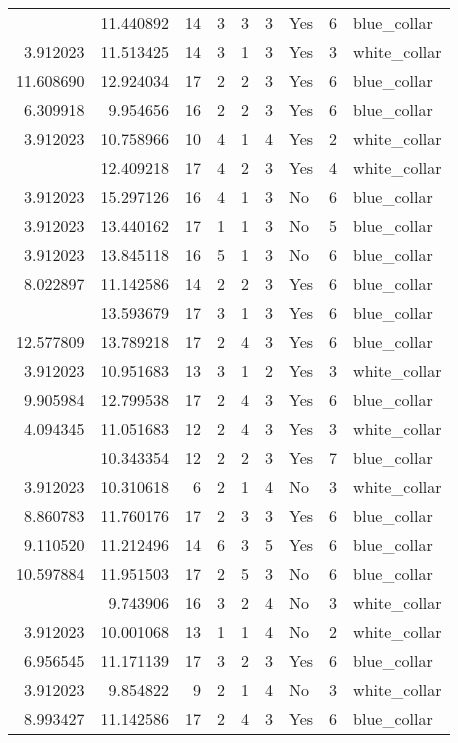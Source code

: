 \documentclass[
]{article}
\begin{document}
\begin{longtable}[t]{rrrrrllrl}
\addlinespace
7.625595 & 11.440892 & 14 & 3 & 3 & 3 & Yes & 6 & blue\_collar\\
3.912023 & 11.513425 & 14 & 3 & 1 & 3 & Yes & 3 & white\_collar\\
11.608690 & 12.924034 & 17 & 2 & 2 & 3 & Yes & 6 & blue\_collar\\
6.309918 & 9.954656 & 16 & 2 & 2 & 3 & Yes & 6 & blue\_collar\\
3.912023 & 10.758966 & 10 & 4 & 1 & 4 & Yes & 2 & white\_collar\\
\addlinespace
10.820778 & 12.409218 & 17 & 4 & 2 & 3 & Yes & 4 & white\_collar\\
3.912023 & 15.297126 & 16 & 4 & 1 & 3 & No & 6 & blue\_collar\\
3.912023 & 13.440162 & 17 & 1 & 1 & 3 & No & 5 & blue\_collar\\
3.912023 & 13.845118 & 16 & 5 & 1 & 3 & No & 6 & blue\_collar\\
8.022897 & 11.142586 & 14 & 2 & 2 & 3 & Yes & 6 & blue\_collar\\
\addlinespace
3.912023 & 13.593679 & 17 & 3 & 1 & 3 & Yes & 6 & blue\_collar\\
12.577809 & 13.789218 & 17 & 2 & 4 & 3 & Yes & 6 & blue\_collar\\
3.912023 & 10.951683 & 13 & 3 & 1 & 2 & Yes & 3 & white\_collar\\
9.905984 & 12.799538 & 17 & 2 & 4 & 3 & Yes & 6 & blue\_collar\\
4.094345 & 11.051683 & 12 & 2 & 4 & 3 & Yes & 3 & white\_collar\\
\addlinespace
10.597884 & 10.343354 & 12 & 2 & 2 & 3 & Yes & 7 & blue\_collar\\
3.912023 & 10.310618 & 6 & 2 & 1 & 4 & No & 3 & white\_collar\\
8.860783 & 11.760176 & 17 & 2 & 3 & 3 & Yes & 6 & blue\_collar\\
9.110520 & 11.212496 & 14 & 6 & 3 & 5 & Yes & 6 & blue\_collar\\
10.597884 & 11.951503 & 17 & 2 & 5 & 3 & No & 6 & blue\_collar\\
\addlinespace
10.779997 & 9.743906 & 16 & 3 & 2 & 4 & No & 3 & white\_collar\\
3.912023 & 10.001068 & 13 & 1 & 1 & 4 & No & 2 & white\_collar\\
6.956545 & 11.171139 & 17 & 3 & 2 & 3 & Yes & 6 & blue\_collar\\
3.912023 & 9.854822 & 9 & 2 & 1 & 4 & No & 3 & white\_collar\\
8.993427 & 11.142586 & 17 & 2 & 4 & 3 & Yes & 6 & blue\_collar\\

\end{longtable}
\end{document}
